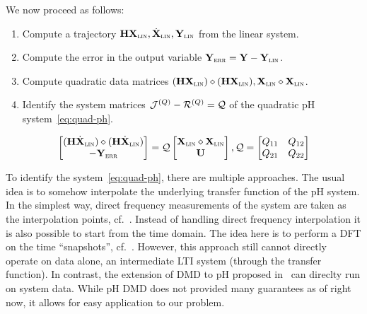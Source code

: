 We now proceed as follows:
\begin{enumerate}
    \item Compute a trajectory $\mathbf{H} \mathbf{X}_{\textsc{lin}}, \dot{\mathbf{X}}_{\textsc{lin}}, \mathbf{Y}_{\textsc{lin}}$ from the linear system.
    \item Compute the error in the output variable $\mathbf{Y}_{\textsc{err}} = \mathbf{Y} - \mathbf{Y}_{\textsc{lin}}$.
    \item Compute quadratic data matrices $(\mathbf{H} \mathbf{X}_{\textsc{lin}}) \diamond (\mathbf{H} \mathbf{X}_{\textsc{lin}}), \mathbf{X}_{\textsc{lin}} \diamond \mathbf{X}_{\textsc{lin}}$.
    \item Identify the system matrices $\mathcal{J}^{(Q)} - \mathcal{R}^{(Q)} = \mathcal{Q}$ of the quadratic pH system~\eqref{eq:quad-ph}.
\end{enumerate}

\begin{equation}\label{eq:quad-ph}
    \begin{bmatrix}
        (\mathbf{H} \dot{\mathbf{X}}_{\textsc{lin}}) \diamond (\mathbf{H} \dot{\mathbf{X}}_{\textsc{lin}}) \\
        - \mathbf{Y}_{\textsc{err}}
    \end{bmatrix} = \mathcal{Q} \begin{bmatrix}
        \mathbf{X}_{\textsc{lin}} \diamond \mathbf{X}_{\textsc{lin}} \\
        \mathbf{U}
    \end{bmatrix}, \mathcal{Q} = \begin{bmatrix}
        Q_{11} & Q_{12} \\
        Q_{21} & Q_{22}
    \end{bmatrix}
\end{equation}

To identify the system~\eqref{eq:quad-ph}, there are multiple approaches.
The usual idea is to somehow interpolate the underlying transfer function of the pH system.
In the simplest way, direct frequency measurements of the system are taken as the interpolation points, cf.~\cite{Gillis2018, Cherifi2019, Benner2020, Schwerdtner2021}.
Instead of handling direct frequency interpolation it is also possible to start from the time domain.
The idea here is to perform a DFT on the time ``snapshots'', cf.~\cite{Peherstorfer2017, Cherifi2021, Cherifi2022}.
However, this approach still cannot directly operate on data alone, an intermediate LTI system (through the transfer function).
In contrast, the extension of DMD to pH proposed in~\cite{Morandin2022} can direclty run on system data.
While pH DMD does not provided many guarantees as of right now, it allows for easy application to our problem.

